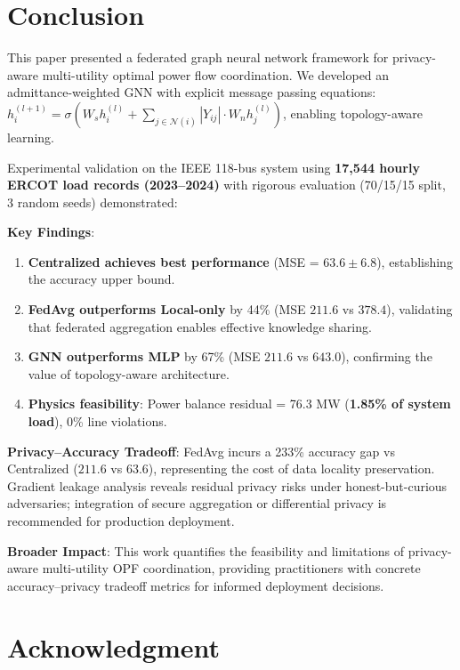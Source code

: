\documentclass[journal,10pt]{IEEEtran}
\begin{document}
\section{Conclusion}

This paper presented a federated graph neural network framework for privacy-aware multi-utility optimal power flow coordination. We developed an admittance-weighted GNN with explicit message passing equations: $h_i^{(l+1)} = \sigma(W_s h_i^{(l)} + \sum_{j \in \mathcal{N}(i)} |Y_{ij}| \cdot W_n h_j^{(l)})$, enabling topology-aware learning.

Experimental validation on the IEEE 118-bus system using \textbf{17,544 hourly ERCOT load records (2023--2024)} with rigorous evaluation (70/15/15 split, 3 random seeds) demonstrated:

\textbf{Key Findings}:
\begin{enumerate}
    \item \textbf{Centralized achieves best performance} (MSE = $63.6 \pm 6.8$), establishing the accuracy upper bound.
    \item \textbf{FedAvg outperforms Local-only} by 44\% (MSE $211.6$ vs $378.4$), validating that federated aggregation enables effective knowledge sharing.
    \item \textbf{GNN outperforms MLP} by 67\% (MSE $211.6$ vs $643.0$), confirming the value of topology-aware architecture.
    \item \textbf{Physics feasibility}: Power balance residual = 76.3 MW (\textbf{1.85\% of system load}), 0\% line violations.
\end{enumerate}

\textbf{Privacy--Accuracy Tradeoff}: FedAvg incurs a 233\% accuracy gap vs Centralized ($211.6$ vs $63.6$), representing the cost of data locality preservation. Gradient leakage analysis reveals residual privacy risks under honest-but-curious adversaries; integration of secure aggregation or differential privacy is recommended for production deployment.

\textbf{Broader Impact}: This work quantifies the feasibility and limitations of privacy-aware multi-utility OPF coordination, providing practitioners with concrete accuracy--privacy tradeoff metrics for informed deployment decisions.

\section*{Acknowledgment}
\end{document}
